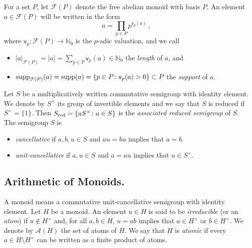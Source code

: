 \documentclass[a4paper, 10pt]{amsart}
\theoremstyle{plain}
\theoremstyle{definition}
\theoremstyle{definition}
\newcommand{\N}{\mathbb N}
\newcommand{\red}{{\text{\rm red}}}
\numberwithin{equation}{section}
\begin{document}
 For a set $P$, let $\mathcal F (P)$ denote the free abelian monoid with basis $P$. An element $a \in \mathcal F (P)$ will be written in the form
\[
a = \prod_{p \in P} p^{\mathsf v_p (a)} \,,
\]
where $\mathsf v_p \colon \mathcal F (P) \to \N_0$ is the $p$-adic valuation, and we call
\begin{itemize}
\item $|a|_{\mathcal F (P)} = |a|= \sum_{p \in P} \mathsf v_p (a) \in  \N_0$ the {\it length} of $a$, and

\item $\operatorname{supp}_{\mathcal F (P)}(a) = \operatorname{supp} (a) = \{p \in P \colon \mathsf v_p (a) > 0 \} \subset P$ the {\it support} of $a$.
\end{itemize}
Let $S$ be a multiplicatively written commutative semigroup with identity element. We denote by $S^{\times}$ its group of invertible elements and we say that $S$ is reduced if $S^{\times} = \{1\}$. Then  $S_{\red} = \{ aS^{\times} \colon a \in S\}$ is  the {\it associated reduced semigroup} of $S$.  The semigroup $S$ is
\begin{itemize}
\item {\it cancellative} if $a,b,u \in S$ and $au=bu$ implies that $a=b$.

\item {\it unit-cancellative} if $a, u \in S$ and $a=au$ implies that $u \in S^{\times}$.
\end{itemize}


\smallskip
\noindent
\subsection{Arithmetic of Monoids.} \label{2.1}
A monoid means a commutative unit-cancellative semigroup with identity element.
Let $H$ be a monoid. An element $u \in H$ is said to be  {\it irreducible} (or an {\it atom}) if $u \notin H^{\times}$ and, for all $a, b \in H$, $u=ab$ implies that $a \in H^{\times}$ or $b \in H^{\times}$. We denote by $\mathcal A (H)$ the set of atoms of $H$.
We say that $H$ is {\it atomic} if every  $a \in H \setminus H^{\times}$ can be written as a finite product of atoms.
\end{document}
